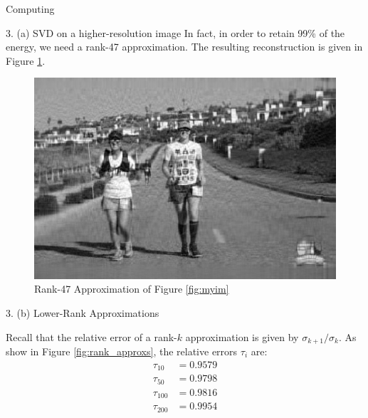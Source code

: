 \begin{section}{Computing}
\begin{homeworkSection}{3. (a) SVD on a higher-resolution image}
In fact, in order to retain 99\% of the energy, we need a rank-47 approximation. The resulting reconstruction is given in Figure \ref{fig:rank_47}.

\begin{figure}[H]
\centering
\includegraphics[width=0.90\columnwidth]{../data/rank_47_approx}
\caption{Rank-47 Approximation of Figure \ref{fig:myim}}
\label{fig:rank_47}
\end{figure}

\end{homeworkSection}

\begin{homeworkSection}{3. (b) Lower-Rank Approximations}

Recall that the relative error of a rank-$k$ approximation is given by $\sigma_{k+1} / \sigma_k$. As show in Figure \ref{fig:rank_approxs}, the relative errors $\tau_i$ are:
\begin{align*}
    \tau_{10} &= 0.9579 \\ 
    \tau_{50} &= 0.9798 \\ 
    \tau_{100} &= 0.9816 \\ 
    \tau_{200} &= 0.9954 \\ 
\end{align*}


\end{homeworkSection}
\end{section}
